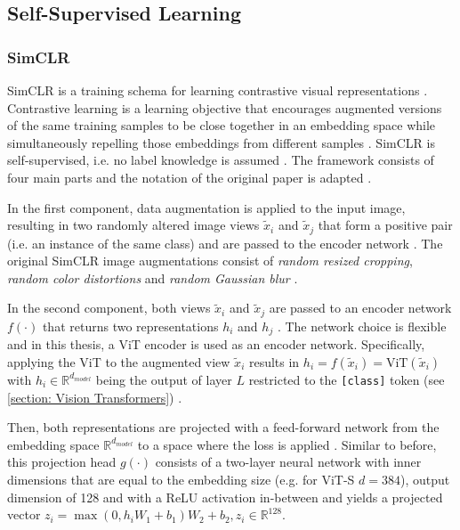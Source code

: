 \subsection{Self-Supervised Learning}
\label{section: SSL}
\subsubsection{SimCLR}
\label{section: SimCLR}
SimCLR is a training schema for learning contrastive visual representations \citep{Chen2020}.
Contrastive learning is a learning objective that encourages augmented versions of the same training samples to be close together in an embedding space while simultaneously repelling those embeddings from different samples \citep{Jaiswal2020}.
SimCLR is self-supervised, i.e. no label knowledge is assumed \citep{Chen2020}.
The framework consists of four main parts and the notation of the original paper is adapted \citep{Chen2020}.
\par
In the first component, data augmentation is applied to the input image, resulting in two randomly altered image views $\tilde{x}_i$ and $\tilde{x}_j$ that form a positive pair (i.e. an instance of the same class) and are passed to the encoder network \citep{Chen2020}.
The original SimCLR image augmentations consist of \textit{random resized cropping}, \textit{random color distortions} and \textit{random Gaussian blur} \citep{Chen2020}.
\par
In the second component, both views $\tilde{x}_i$ and $\tilde{x}_j$ are passed to an encoder network $f(\cdot)$ that returns two representations $h_i$ and $h_j$ \citep{Chen2020}.
The network choice is flexible and in this thesis, a ViT encoder is used as an encoder network.
Specifically, applying the ViT to the augmented view $\tilde{x}_i$ results in $h_i = f(\tilde{x}_i) = \text{ViT}(\tilde{x}_i)$ with $h_i \in \mathbb{R}^{d_{model}}$ being the output of layer $L$ restricted to the \texttt{[class]} token (see \ref{section: Vision Transformers}) \citep{Chen2020}.
\par
Then, both representations are projected with a feed-forward network from the embedding space $\mathbb{R}^{d_{model}}$ to a space where the loss is applied \citep{Chen2020}.
Similar to before, this projection head $g(\cdot)$ consists of a two-layer neural network with inner dimensions that are equal to the embedding size (e.g. for ViT-S $d=384$), output dimension of 128 and with a ReLU activation in-between \citep{Chen2020} and yields a projected vector $z_i = \max(0, h_iW_1 + b_1)W_2+b_2, z_i \in \mathbb{R}^{128}$.
